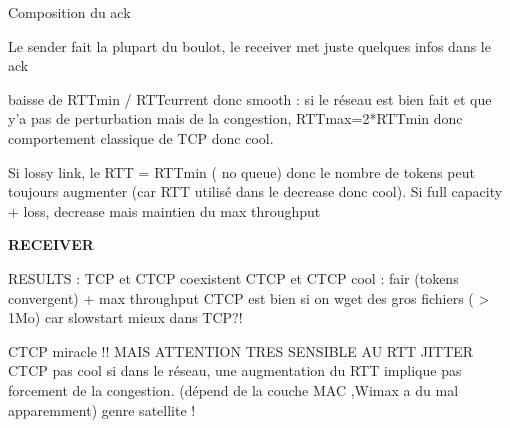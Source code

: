 \documentclass[frenchb]{article}
\begin{document}
Composition du ack



Le sender fait la plupart du boulot, le receiver met juste quelques infos dans le ack




baisse de RTTmin / RTTcurrent donc smooth : si le réseau est bien fait et que y'a pas de perturbation mais de la congestion, RTTmax=2*RTTmin donc comportement classique de TCP donc cool.

Si lossy link, le RTT = RTTmin ( no queue) donc le nombre de tokens peut toujours augmenter (car RTT utilisé dans le decrease donc cool). Si full capacity + loss, decrease mais maintien du max throughput

\textbf{RECEIVER}

RESULTS :
TCP et CTCP coexistent
CTCP et CTCP cool : fair (tokens convergent) + max throughput
CTCP est bien si on wget des gros fichiers ( > 1Mo) car slowstart mieux dans TCP?!


CTCP miracle  !! MAIS ATTENTION TRES SENSIBLE AU RTT JITTER
CTCP pas cool si dans le réseau, une augmentation du RTT implique pas forcement de la congestion. (dépend de la couche MAC ,Wimax a du mal apparemment) genre satellite !
\cite{satellite}
\cite{ctcpmulti}
\cite{ctcp}
\cite{tcp/nc}
\cite{tcp/ncthroughput}
\cite{ncmeetstcp}
\cite{tcpmultipath}
\cite{arqfornc}
\cite{memoryanalysis}



\end{document}
